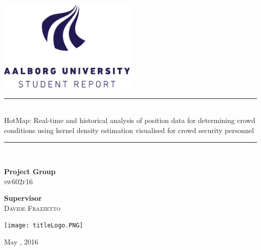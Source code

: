 \begin{titlepage}
\begin{center}
\newcommand{\HRule}{\rule{\linewidth}{0.5mm}}

\includegraphics[width=0.5\textwidth]{figures/aau_logo_en.pdf}~\\[1cm]


\vspace{2em}
\HRule \\[0.1cm]
{
\huge HotMap: Real-time and historical analysis of position data for determining crowd conditions using kernel density estimation visualised for crowd security personnel\\
}

\HRule \\[1.5cm]

\begin{minipage}{0.4\textwidth}
\begin{flushleft} \large
\textbf{Project Group}\\
\textsc{sw602f16}
\end{flushleft}
\end{minipage}
\begin{minipage}{0.4\textwidth}
\begin{flushright} \large
\textbf{Supervisor} \\
\textsc{Davide Frazzetto}
\end{flushright}
\end{minipage}

\begin{center}
\texttt{[image: titleLogo.PNG]}
\end{center}


\vfill

{\large May , 2016}

\end{center}
\end{titlepage}
